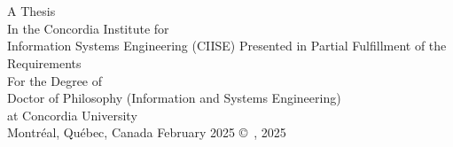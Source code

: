 
\thispagestyle{empty} %

\begin{center} 
\begin{Large} \subject \end{Large}\\[3em]
\begin{large} \student \end{large}\\
\vfill
A Thesis\\
In the Concordia Institute for 
\\ Information Systems Engineering (CIISE)
\vfill
Presented in Partial Fulfillment of the Requirements\\
For the Degree of\\
Doctor of Philosophy (Information and Systems Engineering)\\
at Concordia University\\
Montr\'{e}al, Qu\'{e}bec, Canada
\vfill
February 2025
\vfill
\copyright~\student, 2025\\

\end{center}



